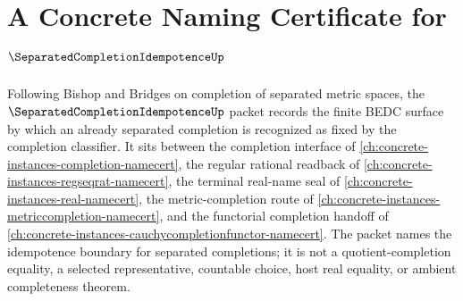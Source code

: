 \chapter{A Concrete Naming Certificate for $\SeparatedCompletionIdempotenceUp$}
\label{ch:concrete-instances-separated-completion-idempotence-namecert}

Following Bishop and Bridges on completion of separated metric spaces, the $\SeparatedCompletionIdempotenceUp$ packet records the finite BEDC surface by which an already separated completion is recognized as fixed by the completion classifier. It sits between the completion interface of \autoref{ch:concrete-instances-completion-namecert}, the regular rational readback of \autoref{ch:concrete-instances-regseqrat-namecert}, the terminal real-name seal of \autoref{ch:concrete-instances-real-namecert}, the metric-completion route of \autoref{ch:concrete-instances-metriccompletion-namecert}, and the functorial completion handoff of \autoref{ch:concrete-instances-cauchycompletionfunctor-namecert}. The packet names the idempotence boundary for separated completions; it is not a quotient-completion equality, a selected representative, countable choice, host real equality, or ambient completeness theorem.

